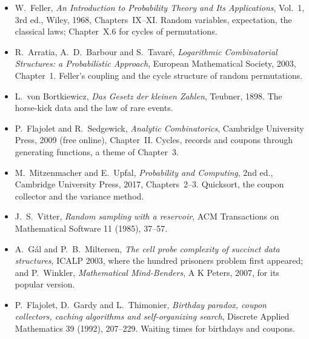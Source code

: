 \begin{itemize}
\item W.~Feller, \emph{An Introduction to Probability Theory and Its Applications}, Vol.~1, 3rd ed., Wiley, 1968,
Chapters~IX--XI. Random variables, expectation, the classical laws; Chapter~X.6 for cycles of permutations.
\item R.~Arratia, A.~D.~Barbour and S.~Tavaré, \emph{Logarithmic Combinatorial Structures: a Probabilistic
Approach}, European Mathematical Society, 2003, Chapter~1. Feller's coupling and the cycle structure of random
permutations.
\item L.~von Bortkiewicz, \emph{Das Gesetz der kleinen Zahlen}, Teubner, 1898. The horse-kick data and the law of
rare events.
\item P.~Flajolet and R.~Sedgewick, \emph{Analytic Combinatorics}, Cambridge University Press, 2009 (free online),
Chapter~II. Cycles, records and coupons through generating functions, a theme of Chapter~3.
\item M.~Mitzenmacher and E.~Upfal, \emph{Probability and Computing}, 2nd ed., Cambridge University Press, 2017,
Chapters~2--3. Quicksort, the coupon collector and the variance method.
\item J.~S.~Vitter, \emph{Random sampling with a reservoir}, ACM Transactions on Mathematical Software 11 (1985),
37--57.
\item A.~Gál and P.~B.~Miltersen, \emph{The cell probe complexity of succinct data structures}, ICALP 2003, where the
hundred prisoners problem first appeared; and P.~Winkler, \emph{Mathematical Mind-Benders}, A K Peters, 2007, for
its popular version.
\item P.~Flajolet, D.~Gardy and L.~Thimonier, \emph{Birthday paradox, coupon collectors, caching algorithms and
self-organizing search}, Discrete Applied Mathematics 39 (1992), 207--229. Waiting times for birthdays and coupons.
\end{itemize}
